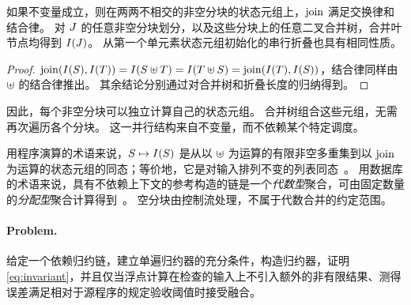 \begin{lemma}
\label{lem:laws}
如果不变量成立，则在两两不相交的非空分块的状态元组上，$\operatorname{join}$ 满足交换律和结合律。
对 $J$ 的任意非空分块划分，以及这些分块上的任意二叉合并树，合并叶节点均得到 $I(J)$。
从第一个单元素状态元组初始化的串行折叠也具有相同性质。
\end{lemma}

\begin{proof}
$\operatorname{join}(I(S),I(T))=I(S\uplus T)=I(T\uplus S)=\operatorname{join}(I(T),I(S))$，结合律同样由 $\uplus$ 的结合律推出。
其余结论分别通过对合并树和折叠长度的归纳得到。
\end{proof}

因此，每个非空分块可以独立计算自己的状态元组。
合并树组合这些元组，无需再次遍历各个分块。
这一并行结构来自不变量，而不依赖某个特定调度。

用程序演算的术语来说，$S\mapsto I(S)$ 是从以 $\uplus$ 为运算的有限非空多重集到以 $\operatorname{join}$ 为运算的状态元组的同态；等价地，它是对输入排列不变的列表同态~\citep{bird87,gibbons96}。
用数据库的术语来说，具有不依赖上下文的参考构造的链是一个\emph{代数型}聚合，可由固定数量的\emph{分配型}聚合计算得到~\citep{datacube}。
空分块由控制流处理，不属于代数合并的约定范围。

\paragraph{Problem.}
给定一个依赖归约链，建立单遍归约器的充分条件，构造归约器，证明 \cref{eq:invariant}，并且仅当浮点计算在检查的输入上不引入额外的非有限结果、测得误差满足相对于源程序的规定验收阈值时接受融合。

